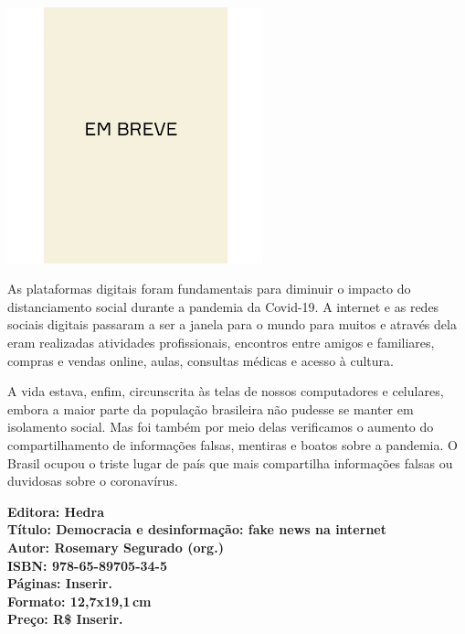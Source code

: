 \begin{center}
\hspace*{.5cm}\includegraphics[width=74mm]{./CAPAS/breve.jpeg}
\end{center}
\hspace*{-7cm}\hrulefill\hspace*{-7cm}
\medskip

\noindent{}As plataformas digitais foram fundamentais para diminuir o impacto do distanciamento social durante a pandemia da Covid-19. A internet e as redes sociais digitais passaram a ser a janela para o mundo para muitos e através dela eram realizadas atividades profissionais, encontros entre amigos e familiares, compras e vendas online, aulas, consultas médicas e acesso à cultura. 

A vida estava, enfim, circunscrita às telas de nossos computadores e celulares, embora a maior parte da população brasileira não pudesse se manter em isolamento social. Mas foi também por meio delas verificamos o aumento do compartilhamento de informações falsas, mentiras e boatos sobre a pandemia. O Brasil ocupou o triste lugar de país que mais compartilha informações falsas ou duvidosas sobre o coronavírus.

\vfill
\noindent\begin{minipage}[c]{1\linewidth}
{\small\textbf{
\hspace*{-.1cm}Editora: Hedra\\
Título: Democracia e desinformação: fake news na internet\\
Autor: Rosemary Segurado (org.)\\ 
ISBN: 978-65-89705-34-5\\
Páginas: Inserir.\\
Formato: 12,7x19,1\,cm\\
Preço: R\$ Inserir.\\
}}
\end{minipage}
\pagebreak

